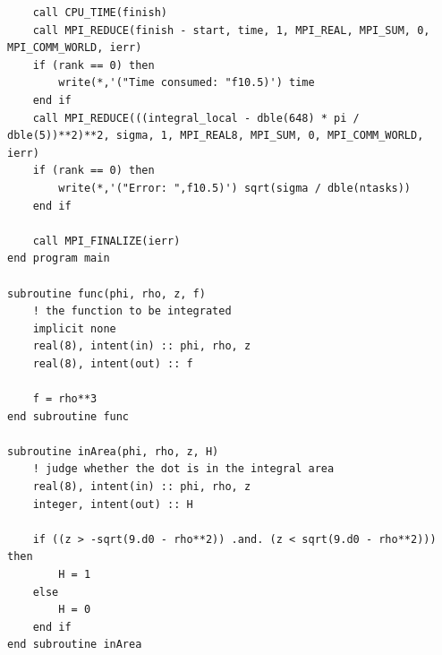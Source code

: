 \documentclass[UTF8,10pt,a4paper]{article}
\theoremstyle{Problem}
\theoremstyle{Solution}
\begin{document}
\begin{lstlisting}
    call CPU_TIME(finish)
    call MPI_REDUCE(finish - start, time, 1, MPI_REAL, MPI_SUM, 0, MPI_COMM_WORLD, ierr)
    if (rank == 0) then
        write(*,'("Time consumed: "f10.5)') time
    end if
    call MPI_REDUCE(((integral_local - dble(648) * pi / dble(5))**2)**2, sigma, 1, MPI_REAL8, MPI_SUM, 0, MPI_COMM_WORLD, ierr)
    if (rank == 0) then
        write(*,'("Error: ",f10.5)') sqrt(sigma / dble(ntasks))
    end if

    call MPI_FINALIZE(ierr)
end program main

subroutine func(phi, rho, z, f)
    ! the function to be integrated
    implicit none
    real(8), intent(in) :: phi, rho, z
    real(8), intent(out) :: f

    f = rho**3
end subroutine func

subroutine inArea(phi, rho, z, H)
    ! judge whether the dot is in the integral area
    real(8), intent(in) :: phi, rho, z
    integer, intent(out) :: H

    if ((z > -sqrt(9.d0 - rho**2)) .and. (z < sqrt(9.d0 - rho**2))) then
        H = 1
    else
        H = 0
    end if
end subroutine inArea
\end{lstlisting}
\end{document}
